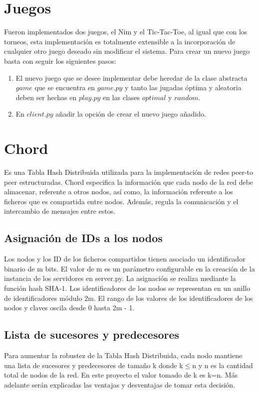 \documentclass[10pt, a4paper]{article}
\begin{document}
    \section{Juegos}
    Fueron implementados dos juegos, el Nim y el Tic-Tac-Toe, al igual que con los torneos, esta implementación es totalmente extensible a la incorporación de cualquier otro juego deseado sin modificar el sistema. Para crear un nuevo juego basta con seguir los siguientes pasos:
    \begin{enumerate}
    	\item El nuevo juego que se desee implementar debe heredar de la clase abstracta $game$ que se encuentra en $game.py$ y tanto las jugadas \'optima y aleatoria deben ser hechas en $play.py$ en las clases $optimal$ y $random$.
    	\item En $client.py$ añadir la opción de crear el nuevo juego añadido.
    \end{enumerate}
    
    \section{Chord}
    Es una Tabla Hash Distribuida utilizada para la implementación de redes peer-to peer estructuradas. Chord especifica la información que cada nodo de la red debe almacenar, referente a otros nodos, así como, la información referente a los ficheros que es compartida entre nodos. Además, regula la comunicación y el intercambio de mensajes entre estos.\\
    
    \subsection{Asignaci\'on de IDs a los nodos}
    Los nodos y los ID de los ficheros compartidos tienen asociado un identificador binario de m bits. El valor de m es un parámetro configurable en la creación de la instancia de los servidores en server.py. La asignación se realiza mediante la función hash SHA-1. Los identificadores de los nodos se representan en un anillo de identificadores módulo 2m. El rango de los valores de los identificadores de los nodos y claves oscila desde 0 hasta 2m - 1.\\
    
    \subsection{Lista de sucesores y predecesores}
    Para aumentar la robustez de la Tabla Hash Distribuida, cada nodo mantiene una lista de sucesores y predecesores de tamaño k donde k$\leq$n y n es la cantidad total de nodos de la red. En este proyecto el valor tomado de k es k=n. Más adelante serán explicadas las ventajas y desventajas de tomar esta decisión.\\
    
\end{document}
